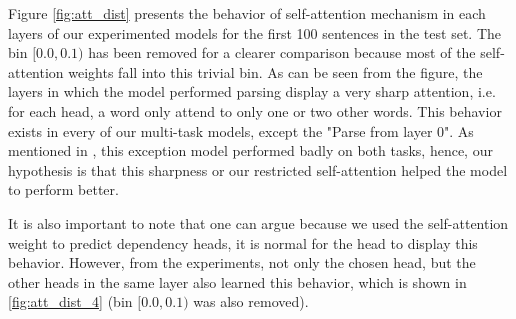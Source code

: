 Figure \ref{fig:att_dist} presents the behavior of self-attention mechanism in each layers of our experimented models for the first 100 sentences in the test set. The bin $[0.0,0.1)$ has been removed for a clearer comparison because most of the self-attention weights fall into this trivial bin. As can be seen from the figure, the layers in which the model performed parsing display a very sharp attention, i.e. for each head, a word only attend to only one or two other words. This behavior exists in every of our multi-task models, except the "Parse from layer 0". As mentioned in , this exception model performed badly on both tasks, hence, our hypothesis is that this sharpness or our restricted self-attention helped the model to perform better.

It is also important to note that one can argue because we used the self-attention weight to predict dependency heads, it is normal for the head to display this behavior. However, from the experiments, not only the chosen head, but the other heads in the same layer also learned this behavior, which is shown in \cref{fig:att_dist_4} (bin $[0.0,0.1)$ was also removed).
